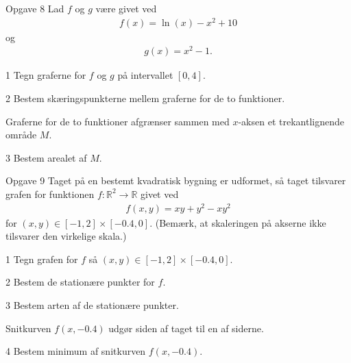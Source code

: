 \documentclass[12pt,x11names,a4paper]{article}
\begin{document}
\begin{opgavetekst}{Opgave 8}
	Lad $f$ og $g$ være givet ved
	\begin{align*}
		f(x) = \ln(x)-x^2+10
	\end{align*}
	og 
	\begin{align*}
		g(x) = x^2-1.
	\end{align*}
\end{opgavetekst}
\begin{delopgave}{}{1}
	Tegn graferne for $f$ og $g$ på intervallet $[0,4]$.
\end{delopgave}
\begin{delopgave}{}{2}
	Bestem skæringspunkterne mellem graferne for de to funktioner. 
\end{delopgave}
\begin{meretekst}
	Graferne for de to funktioner afgrænser sammen med $x$-aksen et trekantlignende område $M$.
\end{meretekst}
\begin{delopgave}{}{3}
	Bestem arealet af $M$. 
\end{delopgave}

\newpage

\begin{opgavetekst}{Opgave 9}
	Taget på en bestemt kvadratisk bygning er udformet, så taget tilsvarer grafen for funktionen $f:\mathbb{R}^2 \to \mathbb{R}$ givet ved
	\begin{align*}
		f(x,y) = xy + y^2 -xy^2
	\end{align*}
	for $(x,y) \in [-1,2]\times [-0.4,0]$. (Bemærk, at skaleringen på akserne ikke tilsvarer den virkelige skala.)
\end{opgavetekst}
\begin{delopgave}{}{1}
	Tegn grafen for $f$ så $(x,y) \in [-1,2] \times [-0.4,0]$. 
\end{delopgave}
\begin{delopgave}{}{2}
	Bestem de stationære punkter for $f$. 
\end{delopgave}
\begin{delopgave}{}{3}
	Bestem arten af de stationære punkter. 
\end{delopgave}
\begin{meretekst}
	Snitkurven $f(x,-0.4)$ udgør siden af taget til en af siderne.
\end{meretekst}
\begin{delopgave}{}{4}
	Bestem minimum af snitkurven $f(x,-0.4)$. 
\end{delopgave}
\end{document}
